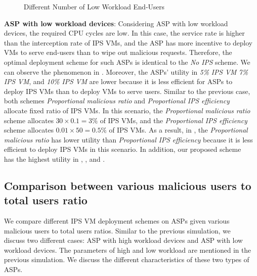 \documentclass[10pt,journal, compsoc]{IEEEtran}
\begin{document}
\begin{figure}[!]
\captionsetup{justification=centering}
  \hfill
  \hfill
\label{fig:num_cmp_low}
\caption{Different Number of Low Workload End-Users}
\end{figure}

\textbf{ASP with low workload devices}:
Considering ASP with low workload devices, the required CPU cycles are low. In this case, the service rate is higher than the interception rate of IPS VMs, and the ASP has more incentive to deploy VMs to serve end-users than to wipe out malicious requests. Therefore, the optimal deployment scheme for such ASPs is identical to the \textit{No IPS} scheme. We can observe the phenomenon in . Moreover, the ASPs' utility in \textit{5\% IPS VM} \textit{7\% IPS VM}, and \textit{10\% IPS VM} are lower because it is less efficient for ASPs to deploy IPS VMs than to deploy VMs to serve users. Similar to the previous case, both schemes \textit{Proportional malicious ratio} and \textit{Proportional IPS efficiency} allocate fixed ratio of IPS VMs. In this scenario, the \textit{Proportional malicious ratio} scheme allocates $30 \times 0.1 = 3\%$ of IPS VMs, and the \textit{Proportional IPS efficiency} scheme allocates $0.01 \times 50 = 0.5\%$ of IPS VMs. As a result, in , the \textit{Proportional malicious ratio} has lower utility than \textit{Proportional IPS efficiency} because it is less efficient to deploy IPS VMs in this scenario. In addition, our proposed scheme has the highest utility in , , and .

\subsection{Comparison between various malicious users to total users ratio}\label{subsec:mal}
We compare different IPS VM deployment schemes on ASPs given various malicious users to total users ratios. Similar to the previous simulation, we discuss two different cases: ASP with high workload devices and ASP with low workload devices. The parameters of high and low workload are mentioned in the previous simulation. We discuss the different characteristics of these two types of ASPs. 
\end{document}
